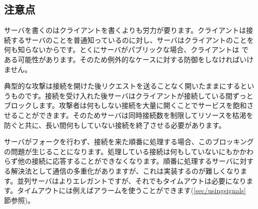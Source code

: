 \subsection*{注意点}

サーバを書くのはクライアントを書くよりも労力が要ります。クライアントは接続するサーバのことを普通知っているのに対し、サーバはクライアントのことを何も知らないからです。とくにサーバがパブリックな場合、クライアントは  である可能性があります。そのため例外的なケースに対する防御をしなければいけません。

典型的な攻撃は接続を開けた後リクエストを送ることなく開いたままにするというものです。接続を受け入れた後サーバはクライアントが接続している間ずっとブロックします。攻撃者は何もしない接続を大量に開くことでサービスを飽和させることができます。そのためサーバは同時接続数を制限してリソースを枯渇を防ぐと共に、長い間何もしていない接続を終了させる必要があります。


サーバがフォークを行わず、接続を来た順番に処理する場合、このブロッキングの問題が生じることになります。処理している接続は何もしていないにもかかわらず他の接続に応答することができなくなります。順番に処理するサーバに対する解決法として通信の多重化がありますが、これは実装するのが難しくなります。並列サーバはよりエレガントですが、それでもタイムアウトは必要になります。タイムアウトには例えばアラームを使うことができます(\ref{sec/usingsignals} 節参照)。

